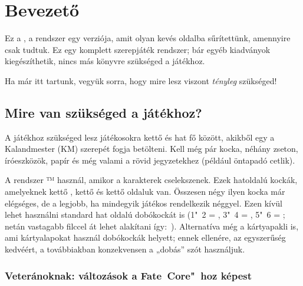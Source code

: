 \chapter{Bevezető}

Ez a , a  rendszer egy verziója, amit olyan kevés oldalba sűrítettünk, amennyire csak tudtuk. Ez egy komplett szerepjáték rendszer; bár egyéb kiadványok kiegészíthetik, nincs más könyvre szükséged a játékhoz.

Ha már itt tartunk, vegyük sorra, hogy mire lesz viszont \emph{tényleg} szükséged!

\section{Mire van szükséged a játékhoz?}

A  játékhoz szükséged lesz játékosokra kettő és hat fő között, akikből egy a Kalandmester (KM) szerepét fogja betölteni. Kell még pár kocka, néhány zseton, íróeszközök, papír és még valami a rövid jegyzetekhez (például öntapadó cetlik).

A  rendszer ™ használ, amikor a karakterek cselekszenek. Ezek hatoldalú kockák, amelyeknek kettő , kettő \dice{+} és kettő \dice{-} oldaluk van. Összesen négy ilyen kocka már elégséges, de a legjobb, ha mindegyik játékos rendelkezik néggyel. Ezen kívül lehet használni standard hat oldalú dobókockát is (1"~2 = \dice{-}, 3"~4 = , 5"~6 = \dice{+}; netán vastagabb filccel át lehet alakítani így:~). Alternatíva még a  kártyapakli is, ami kártyalapokat használ dobókockák helyett; ennek ellenére, az egyszerűség kedvéért, a továbbiakban konzekvensen a „dobás” szót használjuk.

\subsection{Veteránoknak: változások a Fate~Core"~hoz képest}

